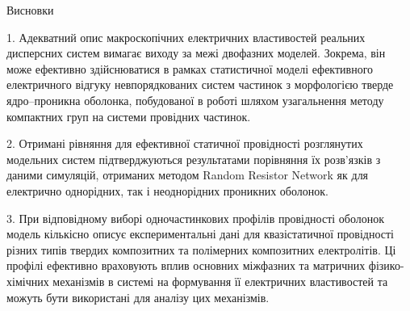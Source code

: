 \documentclass[10pt]{beamer}
\begin{document}
\begin{frame}{Висновки}
\footnotesize


1. Адекватний опис макроскопічних електричних властивостей реальних дисперсних систем вимагає виходу за межі двофазних моделей. Зокрема, він може ефективно здійснюватися в рамках статистичної моделі ефективного електричного відгуку невпорядкованих систем частинок з морфологією тверде ядро--проникна оболонка, побудованої в роботі шляхом узагальнення методу компактних груп на системи провідних частинок.


2. Отримані рівняння для ефективної статичної провідності розглянутих модельних систем підтверджуються результатами порівняння їх розв'язків з даними симуляцій, отриманих методом Random Resistor Network як для електрично однорідних, так і неоднорідних проникних оболонок. 


3. При відповідному виборі одночастинкових профілів провідності оболонок модель кількісно описує експериментальні дані для квазістатичної провідності різних типів твердих композитних та полімерних композитних електролітів. Ці профілі ефективно враховують вплив основних міжфазних та матричних фізико-хімічних механізмів в системі на формування її електричних властивостей та можуть бути використані для аналізу цих механізмів.

\end{frame}
\end{document}
